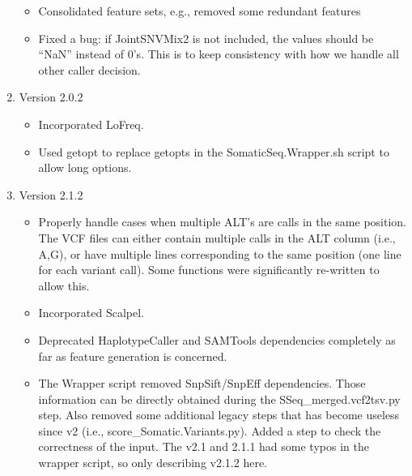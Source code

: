 \documentclass[10pt,letterpaper]{article}
\begin{document}
\begin{sloppypar}
\begin{enumerate}
\begin{itemize}
		  \item
		  Consolidated feature sets, e.g., removed some redundant features
		  
		  \item
		  Fixed a bug: if JointSNVMix2 is not included, the values should be ``NaN'' instead of 0's. This is to keep consistency with how we handle all other caller decision.
		\end{itemize}
	
	
	
	\item Version 2.0.2
	
		\begin{itemize}
		
		  \item
		  Incorporated LoFreq.
		  
		  \item
		  Used getopt to replace getopts in the SomaticSeq.Wrapper.sh script to allow long options. 
		  
		\end{itemize}
	
	
	
	\item Version 2.1.2
	
	\begin{itemize}
	
	  \item
	  Properly handle cases when multiple ALT's are calls in the same position. The VCF files can either contain multiple calls in the ALT column (i.e., A,G), or have multiple lines corresponding to the same position (one line for each variant call). Some functions were significantly re-written to allow this.
	
	  \item
	  Incorporated Scalpel.
	  
	  \item
	  Deprecated HaplotypeCaller and SAMTools dependencies completely as far as feature generation is concerned.
	  
	  \item
	  The Wrapper script removed SnpSift/SnpEff dependencies. Those information can be directly obtained during the SSeq\_merged.vcf2tsv.py step. Also removed some additional legacy steps that has become useless since v2 (i.e., score\_Somatic.Variants.py). Added a step to check the correctness of the input. The v2.1 and 2.1.1 had some typos in the wrapper script, so only describing v2.1.2 here.
	
	\end{itemize}
	

\end{enumerate}
\end{sloppypar}
\end{document}
